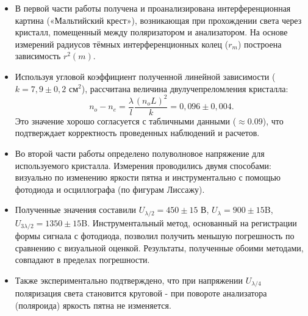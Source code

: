 \documentclass{article}
\begin{document}
\begin{itemize}
    \item В первой части работы получена и проанализирована интерференционная картина («Мальтийский крест»), возникающая при прохождении света через кристалл, помещенный между поляризатором и анализатором. На основе измерений радиусов тёмных интерференционных колец ($r_m$) построена зависимость $r^2(m)$.
    
    \item Используя угловой коэффициент полученной линейной зависимости ($k = 7,9 \pm 0,2 \text{ см}^2$), рассчитана величина двулучепреломления кристалла:
    \[
    n_o - n_e = \dfrac{\lambda}{l} \dfrac{(n_o L)^2}{k} = 0,096 \pm 0,004.
    \]
    Это значение хорошо согласуется с табличными данными ($\approx 0.09$), что подтверждает корректность проведенных наблюдений и расчетов.
    
    \item Во второй части работы определено полуволновое напряжение для используемого кристалла. Измерения проводились двумя способами: визуально по изменению яркости пятна и инструментально с помощью фотодиода и осциллографа (по фигурам Лиссажу).
    
    \item Полученные значения составили $U_{\lambda/2} = 450 \pm 15$ В,  $U_{\lambda} = 900 \pm 15$B, $U_{3\lambda/2} = 1350 \pm 15$B. Инструментальный метод, основанный на регистрации формы сигнала с фотодиода, позволил получить меньшую погрешность по сравнению с визуальной оценкой. Результаты, полученные обоими методами, совпадают в пределах погрешности.
    
    \item Также экспериментально подтверждено, что при напряжении $U_{\lambda/4}$ поляризация света становится круговой - при повороте анализатора (поляроида) яркость пятна не изменяется.
\end{itemize}
\end{document}
